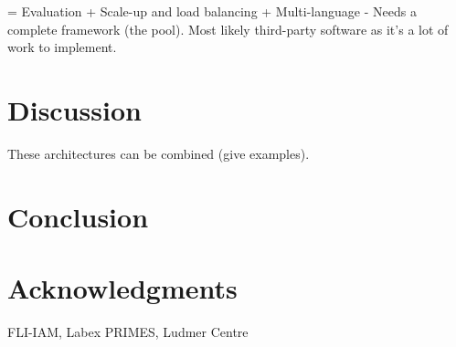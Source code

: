 \documentclass[preprint,3p,twocolumn]{elsarticle}
\begin{document}
= Evaluation
+ Scale-up and load balancing
+ Multi-language
- Needs a complete framework (the pool). Most likely third-party software as it's a lot of work to implement.


\section{Discussion}

These architectures can be combined (give examples). 

\section{Conclusion}

\section{Acknowledgments}

FLI-IAM, Labex PRIMES, Ludmer Centre

 

\end{document}
